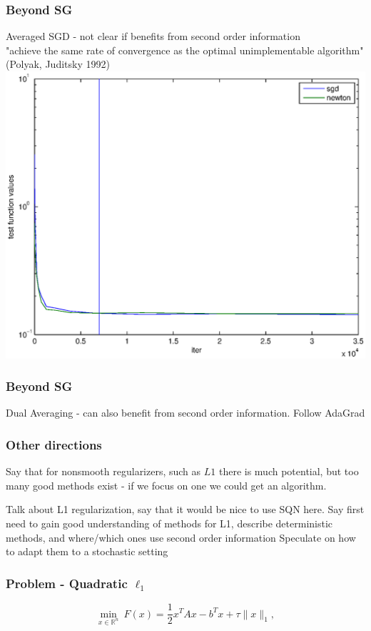 \documentclass{beamer}
\begin{document}
	\begin{frame}
		\frametitle{Beyond SG}
		Averaged SGD - not clear if benefits from second order information\\
		"achieve the same rate of convergence as the optimal unimplementable algorithm" (Polyak, Juditsky 1992)
		\includegraphics[scale=0.4]{figures/P03.eps}
	\end{frame}

	\begin{frame}
		\frametitle{Beyond SG}
		Dual Averaging - can also benefit from second order information. 
		Follow AdaGrad
	\end{frame}
	
	
	
	\begin{frame}

		\frametitle{Other directions}
		Say that for nonsmooth regularizers, such as $L1$ there is much potential, but too many good methods exist - if we focus on one we could get an algorithm. 

		Talk about L1 regularization, say that it would be nice to use SQN here. 
		Say first need to gain good understanding of methods for L1, describe deterministic methods, and where/which ones use second order information
		Speculate on how to adapt them to a stochastic setting
		\end{frame}
	
	
	\begin{frame}
		\frametitle{Problem - Quadratic $\ell_1$}
	\begin{equation*}
		\min_{x \in \mathbb{R}^n} \ F(x) = \frac{1}{2}x^T A x - b^T x +\tau \|x\|_1 ,
	\end{equation*}
		\end{frame}
\end{document}
